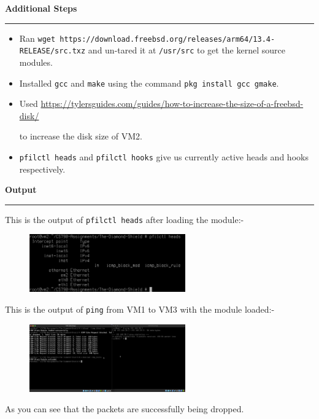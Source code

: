 \documentclass[a4paper,12pt]{article}
\newenvironment{solution}[2][]{%
\begin{mdframed}[linecolor=blue!70!black, linewidth=2pt, roundcorner=10pt, backgroundcolor=yellow!10!white, skipabove=12pt, skipbelow=12pt]%
	\textbf{\large #2}
	\par\noindent\rule{\textwidth}{0.4pt}
}{
\end{mdframed}
}
\begin{document}
\begin{solution}{Additional Steps}
    \begin{itemize}
        \item Ran \texttt{wget https://download.freebsd.org/releases/arm64/13.4-RELEASE/src.txz} and un-tared it at \texttt{/usr/src} to get the kernel source modules.
        \item Installed \texttt{gcc} and \texttt{make} using the command \texttt{pkg install gcc gmake}.
        \item Used {\small \url{https://tylersguides.com/guides/how-to-increase-the-size-of-a-freebsd-disk/}}
        
        to increase the disk size of VM2.
        \item \texttt{pfilctl heads} and \texttt{pfilctl hooks} give us currently active heads and hooks respectively.
    \end{itemize}
\end{solution}

\begin{solution}{Output}
    This is the output of \texttt{pfilctl heads} after loading the module:-
    \begin{figure}[H]
        \centering
        \includegraphics[width=0.6\textwidth]{pfilctl.png}
    \end{figure}
    This is the output of \texttt{ping} from VM1 to VM3 with the module loaded:-
    \begin{figure}[H]
        \centering
        \includegraphics[width=0.6\textwidth]{task-2.png}
    \end{figure}
    As you can see that the packets are successfully being dropped.
\end{solution}
\end{document}
